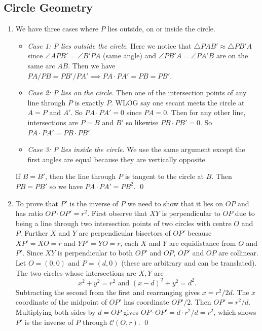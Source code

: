 \subsection{Circle Geometry}
\begin{enumerate}[font=\bfseries]
    \item[27] We have three cases where \(P\) lies outside, on or inside the circle.
          \begin{itemize}
              \item \textit{Case 1: P lies outside the circle}. Here we notice that \(\triangle PAB' \approx \triangle PB'A\) since \(\angle APB' = \angle B'PA\) (same angle) and \(\angle PB'A = \angle PA'B\) are on the same arc \(AB\). Then we have \(PA / PB = PB' / PA' \implies PA \cdot PA' = PB = PB'\).
              \item \textit{Case 2: P lies on the circle}. Then one of the intersection points of any line through \(P\) is exactly \(P\). WLOG say one secant meets the circle at \(A = P\) and \(A'\). So \(PA \cdot PA' = 0\) since \(PA = 0\). Then for any other line, intersections are \(P = B\) and \(B'\) so likewise \(PB \cdot PB' = 0\). So \(PA \cdot PA' = PB \cdot PB'\).
              \item \textit{Case 3: P lies inside the circle}. We use the same argument except the first angles are equal because they are vertically opposite.
          \end{itemize}
          If \(B = B'\), then the line through \(P\) is tangent to the circle at \(B\). Then \(PB = PB'\) so we have \(PA \cdot PA' = PB^2\). \qed
    \item[28] To prove that \(P'\) is the inverse of \(P\) we need to show that it lies on \(OP\) and has ratio \(OP \cdot OP' = r^2\). First observe that \(XY\) is perpendicular to \(OP\) due to being a line through two intersection points of two circles with centre \(O\) and \(P\). Further \(X\) and \(Y\) are perpendicular bisectors of \(OP'\) because \(XP' = XO = r\) and \(YP' = YO = r\), each \(X\) and \(Y\) are equidistance from \(O\) and \(P'\). Since \(XY\) is perpendicular to both \(OP'\) and \(OP\), \(OP'\) and \(OP\) are collinear. Let \(O = (0, 0)\) and \(P = (d, 0)\) (these are arbitrary and can be translated). The two circles whose intersections are \(X, Y\) are
          \[x^2 + y^2 = r^2 \text{ and } (x - d)^2 + y^2 = d^2.\]
          Subtracting the second from the first and rearranging gives \(x = r^2 / 2d\). The \(x\) coordinate of the midpoint of \(OP'\) has coordinate \(OP' / 2\). Then \(OP' = r^2 / d\). Multiplying both sides by \(d = OP\) gives \(OP \cdot OP' = d \cdot r^2 / d = r^2\), which shows \(P'\) is the inverse of \(P\) through \(\mathcal{C}(O, r)\). \qed \\


\end{enumerate}
